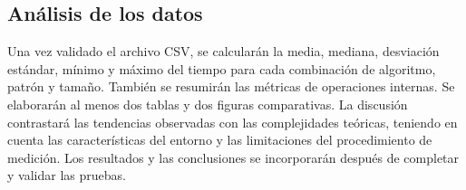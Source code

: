 \subsection{Análisis de los datos}

Una vez validado el archivo CSV, se calcularán la media, mediana, desviación estándar, mínimo y máximo del tiempo para cada combinación de algoritmo, patrón y tamaño. También se resumirán las métricas de operaciones internas. Se elaborarán al menos dos tablas y dos figuras comparativas. La discusión contrastará las tendencias observadas con las complejidades teóricas, teniendo en cuenta las características del entorno y las limitaciones del procedimiento de medición. Los resultados y las conclusiones se incorporarán después de completar y validar las pruebas.


\onecolumn
\printbibliography[title={Referencias}]

